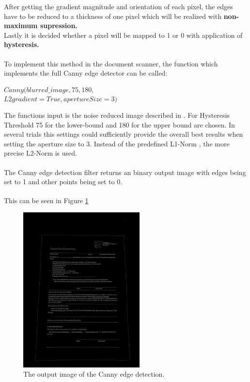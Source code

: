 \documentclass[twocolumn,10pt]{asme2ej}
\begin{document}
\noindent
After getting the gradient magnitude and orientation of each pixel, the edges have
to be reduced to a thickness of one pixel which will be realized with \textbf{non-maximum supression.}
\\
Lastly it is decided whether a pixel will be mapped to 1 or 0 with application of \textbf{hysteresis.}\\\\
\noindent
To implement this method in the document scanner, the function
which implements the full Canny edge detector\cite{opencv_canny} can be called:
\begin{center}
    \noindent
    $Canny(blurred\_image,75, 180,$\\
    $L2gradient = True, apertureSize = 3)$
\end{center}
\noindent
The functions input is the noise reduced image described in .
For Hysteresis Threshold 75 for the lower-bound and 180 for the upper bound are chosen.
In several trials this settings could sufficiently provide the overall best results 
when setting the aperture size to 3.
Instead of the predefined L1-Norm \cite{l1_norm}, the more precise L2-Norm\cite{l2_norm} is used.
\\\\
The Canny edge detection filter returns an binary output image with edges
being set to 1 and other points being set to 0.
\\\\
This can be seen in Figure \ref{fig:canny}

\begin{figure}[H]
\centerline{\includegraphics[width=2.5in]{output/hoch_3_4_canny.jpg}}
\caption{The output image of the Canny edge detection.}
\label{fig:canny}
\end{figure}
\end{document}
